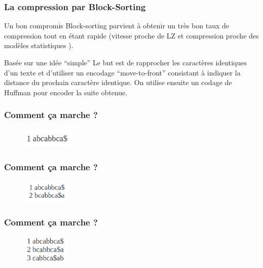 \documentclass[10pt]{beamer}
\begin{document}
\begin{frame}
  \frametitle{La compression par Block-Sorting}

  \begin{block}{Un bon compromis}
    Block-sorting parvient à obtenir un très bon taux de compression
    tout en étant rapide (vitesse proche de LZ et compression proche
    des modèles statistiques \cite{Burrows94}).
  \end{block}

  \begin{block}{Basée sur une idée ``simple''}
    Le but est de rapprocher les caractères identiques d'un texte et
    d'utiliser un encodage ``move-to-front'' consistant à indiquer la
    distance du prochain caractère identique. On utilise ensuite un
    codage de Huffman pour encoder la suite obtenue.
  \end{block}


\end{frame}

\begin{frame}
  \frametitle{Comment ça marche ?}
  \begin{figure}
    \includegraphics[width=0.22\textwidth]{start_burrows}
  \end{figure}

\end{frame}

\begin{frame}
  \frametitle{Comment ça marche ?}
  \begin{figure}
    \includegraphics[width=0.21\textwidth]{1_burrows}
  \end{figure}

\end{frame}

\begin{frame}
  \frametitle{Comment ça marche ?}
  \begin{figure}
    \includegraphics[width=0.2\textwidth]{2_burrows}
  \end{figure}

\end{frame}
\end{document}
